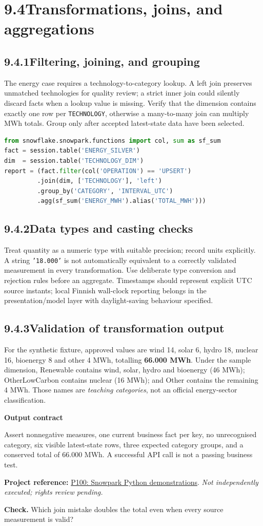 \documentclass[11pt,twoside]{article}
\newcommand{\topic}[2]{\subsection*{#1\quad #2}}
\newcommand{\repo}[2]{\par\begingroup\fontsize{8.0}{9.6}\selectfont\sffamily\color{inkgray}\textbf{Project reference:} \href{#2}{#1}. \textit{Not independently executed; rights review pending.}\par\endgroup}
\begin{document}
\section*{9.4\quad Transformations, joins, and aggregations}
\topic{9.4.1}{Filtering, joining, and grouping}
The energy case requires a technology-to-category lookup. A left join preserves unmatched technologies for quality review; a strict inner join could silently discard facts when a lookup value is missing. Verify that the dimension contains exactly one row per \texttt{TECHNOLOGY}, otherwise a many-to-many join can multiply MWh totals. Group only after accepted latest-state data have been selected.
\begin{lstlisting}[language=Python,caption={Core Snowpark plan used by the companion project.}]
from snowflake.snowpark.functions import col, sum as sf_sum
fact = session.table('ENERGY_SILVER')
dim  = session.table('TECHNOLOGY_DIM')
report = (fact.filter(col('OPERATION') == 'UPSERT')
         .join(dim, ['TECHNOLOGY'], 'left')
         .group_by('CATEGORY', 'INTERVAL_UTC')
         .agg(sf_sum('ENERGY_MWH').alias('TOTAL_MWH')))
\end{lstlisting}
\topic{9.4.2}{Data types and casting checks}
Treat quantity as a numeric type with suitable precision; record units explicitly. A string \texttt{'18.000'} is not automatically equivalent to a correctly validated measurement in every transformation. Use deliberate type conversion and rejection rules before an aggregate. Timestamps should represent explicit UTC source instants; local Finnish wall-clock reporting belongs in the presentation/model layer with daylight-saving behaviour specified.
\topic{9.4.3}{Validation of transformation output}
For the synthetic fixture, approved values are wind 14, solar 6, hydro 18, nuclear 16, bioenergy 8 and other 4 MWh, totalling \textbf{66.000 MWh}. Under the sample dimension, Renewable contains wind, solar, hydro and bioenergy (46 MWh); OtherLowCarbon contains nuclear (16 MWh); and Other contains the remaining 4 MWh. Those names are \emph{teaching categories}, not an official energy-sector classification.
\begin{whitebox}\textbf{Output contract}\par
Assert nonnegative measures, one current business fact per key, no unrecognised category, six visible latest-state rows, three expected category groups, and a conserved total of 66.000 MWh. A successful API call is not a passing business test.\end{whitebox}
\repo{P100: Snowpark Python demonstrations}{https://github.com/Snowflake-Labs/snowpark-python-demos}
\textbf{Check.} Which join mistake doubles the total even when every source measurement is valid?
\newpage
\end{document}
